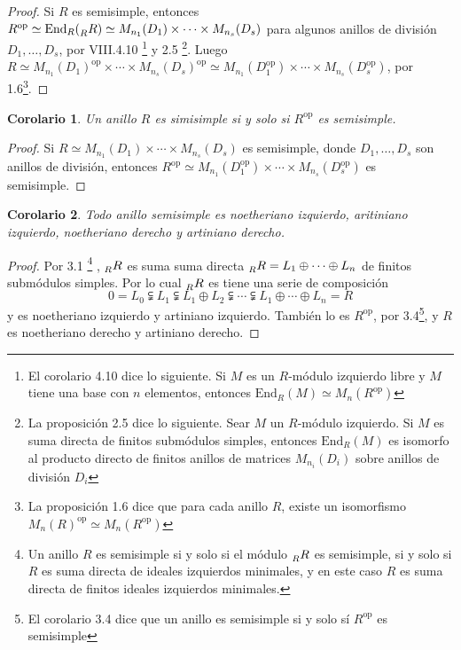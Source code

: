 \documentclass{article}
\newtheorem{corollary}{Corolario}[section]
\newcommand{\End}{\text{End}}
\newcommand{\RAsRModule}{\prescript{}{R}{R}}
\begin{document}
\begin{proof}
    Si $R$ es semisimple, entonces $R^{\text{op}} \simeq \End_R(\prescript{}{R}{R}) \simeq M_{n_1}(D_1) \times \cdots \times M_{n_s}(D_s)$ para algunos anillos de división $D_1, \dots, D_s$, por VIII.4.10
    \footnote{
        El corolario 4.10 dice lo siguiente.
        Si $M$ es un $R$-módulo izquierdo libre y $M$ tiene una base con $n$ elementos, entonces $\End_R(M) \simeq M_n(R^{\text{op}})$
    }
    y 2.5
    \footnote{
        La proposición 2.5 dice lo siguiente.
        Sear $M$ un $R$-módulo izquierdo.
        Si $M$ es suma directa de finitos submódulos simples, entonces $\End_R(M)$ es isomorfo al producto directo de finitos anillos de matrices $M_{n_i}(D_i)$ sobre anillos de división $D_i$
    }.
    Luego $R \simeq M_{n_1}(D_1)^{\text{op}} \times \cdots \times M_{n_s}(D_s)^{\text{op}} \simeq M_{n_1}(D_1^{\text{op}}) \times \cdots \times M_{n_s}(D_s^{\text{op}})$, por 1.6\footnote{La proposición 1.6 dice que para cada anillo $R$, existe un isomorfismo $M_n(R)^{\text{op}} \simeq M_n(R^{\text{op}})$}.
\end{proof}

\begin{corollary}
    Un anillo $R$ es simisimple si y solo si $R^\text{op}$ es semisimple.
\end{corollary}

\begin{proof}
    Si $R \simeq M_{n_1}(D_1) \times \cdots \times M_{n_s}(D_s)$ es semisimple, donde $D_1, \dots, D_s$ son anillos de división, entonces $R^\text{op} \simeq M_{n_1}(D_1^{\text{op}}) \times \cdots \times M_{n_s}(D_s^{\text{op}})$ es semisimple.
\end{proof}

\begin{corollary}
    Todo anillo semisimple es noetheriano izquierdo, aritiniano izquierdo, noetheriano derecho y artiniano derecho.
\end{corollary}

\begin{proof}
    Por 3.1
    \footnote{Un anillo $R$ es semisimple si y solo si el módulo $\prescript{}{R}{R}$ es semisimple, si y solo si $R$ es suma directa de ideales izquierdos minimales, y en este caso $R$ es suma directa de finitos ideales izquierdos minimales.}
    , $\prescript{}{R}{R}$ es suma suma directa $\prescript{}{R}{R} = L_1 \oplus \cdots \oplus L_n$ de finitos submódulos simples.
    Por lo cual $\RAsRModule$ es tiene una serie de composición 
    \[
        0 = L_0 \subsetneqq L_1 \subsetneqq L_1 \oplus L_2 \subsetneqq \cdots \subsetneqq L_1 \oplus \cdots \oplus L_n = R
    \]
    y es noetheriano izquierdo y artiniano izquierdo.
    También lo es $R^\text{op}$, por 3.4\footnote{El corolario 3.4 dice que un anillo es semisimple si y solo sí $R^\text{op}$ es semisimple}, y $R$ es noetheriano derecho y artiniano derecho.
\end{proof}
\end{document}
